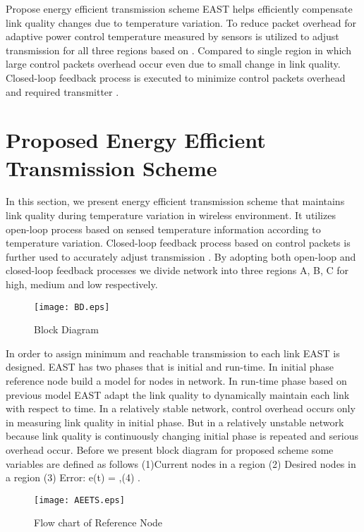 \documentclass[12pt, conference, compsocconf, onecolumn, draftcls]{IEEEtran}
\begin{document}
Propose energy efficient transmission scheme EAST helps efficiently compensate link quality changes due to temperature variation. To reduce packet overhead for adaptive power control temperature measured by sensors is utilized to adjust transmission  for all  three regions based on . Compared to single region in which large control packets overhead occur even due to small change in link quality. Closed-loop feedback process is executed to minimize control packets overhead and required transmitter .

\section{Proposed Energy Efficient Transmission Scheme}

In this section, we present energy efficient transmission scheme that maintains link quality during temperature variation in wireless environment. It utilizes open-loop process based on sensed temperature information according to temperature variation. Closed-loop feedback process based on control packets is further used to accurately adjust transmission . By adopting both open-loop and closed-loop feedback processes we divide network into three regions A, B, C for high, medium and low  respectively.

\begin{figure}[h]
\begin{center}
\texttt{[image: BD.eps]}
\caption{Block Diagram}
\end{center}
\end{figure}

In order to assign minimum and reachable transmission  to each link EAST is designed. EAST has two phases that is initial and run-time. In initial phase reference node build a model for nodes in network. In run-time phase based on previous model EAST adapt the link quality to dynamically maintain each link with respect to time. In a relatively stable network, control overhead occurs only in measuring link quality in initial phase. But in a relatively unstable network because link quality is continuously changing initial phase is repeated and serious overhead occur. Before we present block diagram for proposed scheme some variables are defined as follows (1)Current nodes in a region  (2) Desired nodes in a region  (3) Error: e(t) = ,(4) .


\begin{figure*}[t]
\begin{center}
\texttt{[image: AEETS.eps]}
\caption{Flow chart of Reference Node}
\end{center}
\end{figure*}
\end{document}
